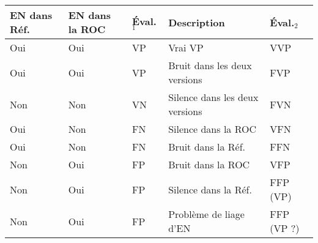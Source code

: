 \begin{tabular}{|l|l|l|l|l|}
\hline
EN dans Réf.\ & EN dans la ROC & Éval.$_1$ & Description &  Éval.$_2$ \\
\hline
Oui      & Oui & VP    & Vrai VP & VVP \\ 
\hline
Oui      & Oui & VP    & Bruit dans les deux versions & FVP \\ 
\hline
\hline
Non        & Non       & VN    & Silence dans les deux versions   & FVN\\ 
\hline
\hline
Oui     & Non         & FN    & Silence dans la ROC & VFN \\ 
\hline
Oui     & Non         & FN    &  Bruit dans la Réf.\ & FFN \\ 
\hline
\hline
Non       & Oui        & FP     &  Bruit dans la ROC & VFP \\
\hline
Non       & Oui        & FP     &  Silence dans la Réf.\ & FFP (VP) \\
\hline
Non       & Oui        & FP     &  Problème de liage d'EN & FFP (VP ?)\\
\hline
\end{tabular}


